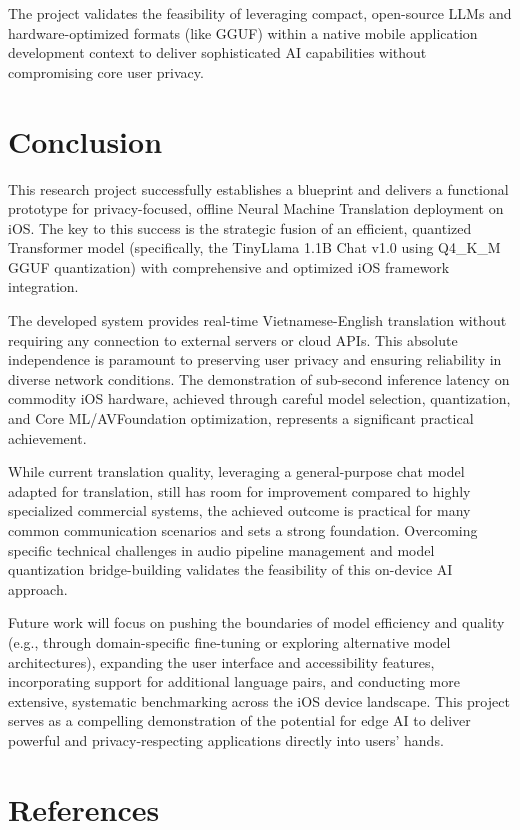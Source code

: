 \documentclass[12pt]{article}
\begin{document}
The project validates the feasibility of leveraging compact, open-source LLMs and hardware-optimized formats (like GGUF) within a native mobile application development context to deliver sophisticated AI capabilities without compromising core user privacy.

\section{Conclusion}

This research project successfully establishes a blueprint and delivers a functional prototype for privacy-focused, offline Neural Machine Translation deployment on iOS. The key to this success is the strategic fusion of an efficient, quantized Transformer model (specifically, the TinyLlama 1.1B Chat v1.0 using Q4\_K\_M GGUF quantization) with comprehensive and optimized iOS framework integration.

The developed system provides real-time Vietnamese-English translation without requiring any connection to external servers or cloud APIs. This absolute independence is paramount to preserving user privacy and ensuring reliability in diverse network conditions. The demonstration of sub-second inference latency on commodity iOS hardware, achieved through careful model selection, quantization, and Core ML/AVFoundation optimization, represents a significant practical achievement.

While current translation quality, leveraging a general-purpose chat model adapted for translation, still has room for improvement compared to highly specialized commercial systems, the achieved outcome is practical for many common communication scenarios and sets a strong foundation. Overcoming specific technical challenges in audio pipeline management and model quantization bridge-building validates the feasibility of this on-device AI approach.

Future work will focus on pushing the boundaries of model efficiency and quality (e.g., through domain-specific fine-tuning or exploring alternative model architectures), expanding the user interface and accessibility features, incorporating support for additional language pairs, and conducting more extensive, systematic benchmarking across the iOS device landscape. This project serves as a compelling demonstration of the potential for edge AI to deliver powerful and privacy-respecting applications directly into users' hands.

\section*{References}
\end{document}
